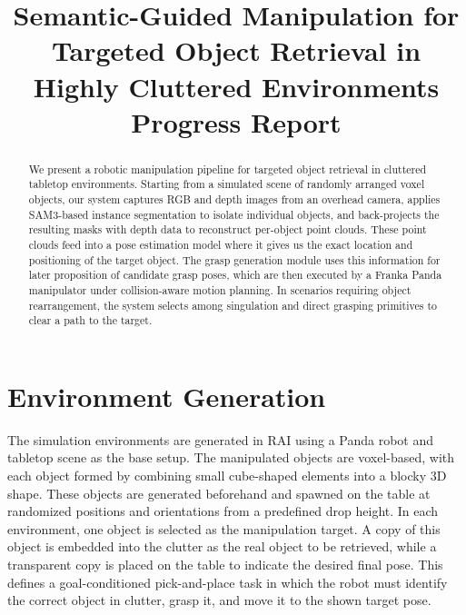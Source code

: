 \documentclass[conference]{IEEEtran}
\begin{document}
\title{Semantic-Guided Manipulation for Targeted Object Retrieval in Highly Cluttered Environments\\
{\large Progress Report}}

\author{
    \and
    \and
    \and
    \and
}

\maketitle

\begin{abstract}
We present a robotic manipulation pipeline for targeted object retrieval in cluttered tabletop environments. Starting from a simulated scene of randomly arranged voxel objects, our system captures RGB and depth images from an overhead camera, applies SAM3-based instance segmentation to isolate individual objects, and back-projects the resulting masks with depth data to reconstruct per-object point clouds. These point clouds feed into a pose estimation model where it gives us the exact location and positioning of the target object. The grasp generation module uses this information for later proposition of candidate grasp poses, which are then executed by a Franka Panda manipulator under collision-aware motion planning. In scenarios requiring object rearrangement, the system selects among singulation and direct grasping primitives to clear a path to the target.
\end{abstract}
\section{Environment Generation}

The simulation environments are generated in RAI using a Panda robot and tabletop scene as the base setup. The manipulated objects are voxel-based, with each object formed by combining small cube-shaped elements into a blocky 3D shape. These objects are generated beforehand and spawned on the table at randomized positions and orientations from a predefined drop height. In each environment, one object is selected as the manipulation target. A copy of this object is embedded into the clutter as the real object to be retrieved, while a transparent copy is placed on the table to indicate the desired final pose. This defines a goal-conditioned pick-and-place task in which the robot must identify the correct object in clutter, grasp it, and move it to the shown target pose.
\end{document}
